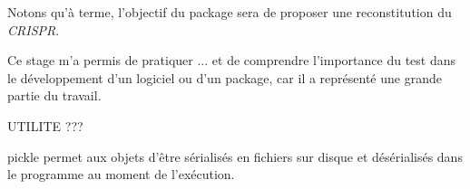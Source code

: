 \documentclass[twoside,a4paper,11pt,frenchb,openany]{report}
\begin{document}
Notons qu'à terme, l'objectif du package sera de proposer une reconstitution du \textit{CRISPR}.
	

Ce stage m'a permis de pratiquer ... et de comprendre l'importance du test dans le développement d'un logiciel ou d'un package, car il a représenté une grande partie du travail.


	



UTILITE ???

pickle permet aux objets d'être sérialisés en fichiers sur disque et désérialisés dans le programme au moment de l'exécution.
	


\printindex



\end{document}
